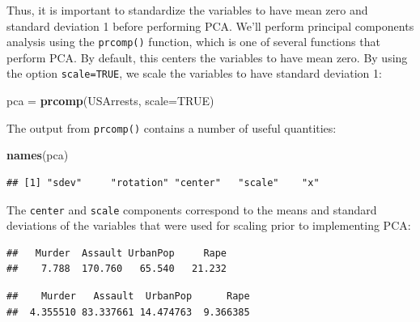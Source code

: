 \documentclass[openany]{book}
\newenvironment{Shaded}{\begin{snugshade}}{\end{snugshade}}
\newcommand{\DataTypeTok}[1]{\textcolor[rgb]{0.13,0.29,0.53}{#1}}
\newcommand{\KeywordTok}[1]{\textcolor[rgb]{0.13,0.29,0.53}{\textbf{#1}}}
\newcommand{\NormalTok}[1]{#1}
\newcommand{\OperatorTok}[1]{\textcolor[rgb]{0.81,0.36,0.00}{\textbf{#1}}}
\newcommand{\OtherTok}[1]{\textcolor[rgb]{0.56,0.35,0.01}{#1}}
\newcommand{\StringTok}[1]{\textcolor[rgb]{0.31,0.60,0.02}{#1}}
\begin{document}
Thus, it is important to standardize the
variables to have mean zero and standard deviation 1 before performing
PCA. We'll perform principal components analysis using the \texttt{prcomp()} function, which is one of several functions that perform PCA. By default, this centers the variables to have mean zero. By using the option \texttt{scale=TRUE}, we scale the variables to have standard
deviation 1:

\begin{Shaded}
\begin{Highlighting}[]
\NormalTok{pca =}\StringTok{ }\KeywordTok{prcomp}\NormalTok{(USArrests, }\DataTypeTok{scale=}\OtherTok{TRUE}\NormalTok{)}
\end{Highlighting}
\end{Shaded}

The output from \texttt{prcomp()} contains a number of useful quantities:

\begin{Shaded}
\begin{Highlighting}[]
\KeywordTok{names}\NormalTok{(pca)}
\end{Highlighting}
\end{Shaded}

\begin{verbatim}
## [1] "sdev"     "rotation" "center"   "scale"    "x"
\end{verbatim}

The \texttt{center} and \texttt{scale} components correspond to the means and standard
deviations of the variables that were used for scaling prior to implementing
PCA:

\begin{Shaded}
\end{Shaded}

\begin{verbatim}
##   Murder  Assault UrbanPop     Rape 
##    7.788  170.760   65.540   21.232
\end{verbatim}

\begin{Shaded}
\end{Shaded}

\begin{verbatim}
##    Murder   Assault  UrbanPop      Rape 
##  4.355510 83.337661 14.474763  9.366385
\end{verbatim}
\end{document}
